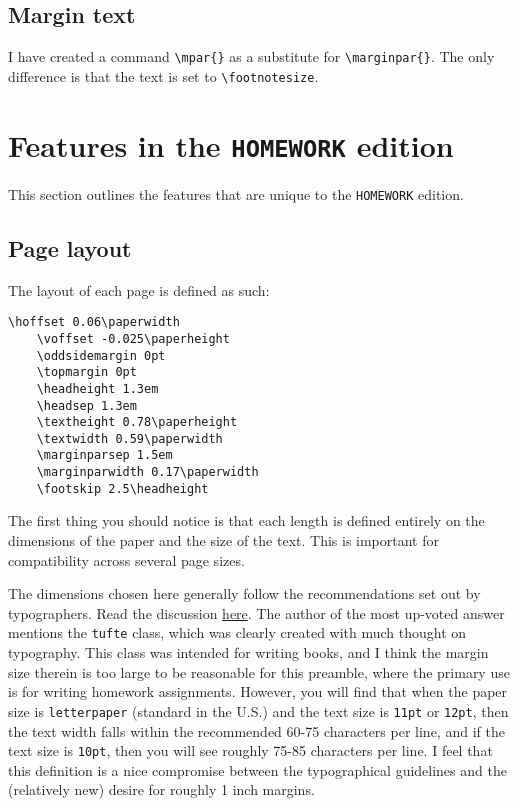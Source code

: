 \documentclass[letterpaper,12pt]{article}
\begin{document}
		\subsection{Margin text}
		I have created a command \verb|\mpar{}| as a substitute for 
		\verb|\marginpar{}|. The only difference is that the text is set to 
		\verb|\footnotesize|.


\section{Features in the \texttt{HOMEWORK} edition}
This section outlines the features that are unique to the \texttt{HOMEWORK} edition.

	\subsection{Page layout}
	The layout of each page is defined as such:
	\begin{Verbatim}[frame=single,gobble=1,fontsize=\small]
	\hoffset 0.06\paperwidth
	\voffset -0.025\paperheight
	\oddsidemargin 0pt
	\topmargin 0pt
	\headheight 1.3em
	\headsep 1.3em
	\textheight 0.78\paperheight
	\textwidth 0.59\paperwidth
	\marginparsep 1.5em
	\marginparwidth 0.17\paperwidth
	\footskip 2.5\headheight
	\end{Verbatim}
	The first thing you should notice is that each length is defined entirely on the dimensions of the paper and the size of the text. This is important for compatibility across several page sizes.
	
	The dimensions chosen here generally follow the recommendations set out by typographers. Read the discussion \href{http://tex.stackexchange.com/questions/71172/why-are-default-latex-margins-so-big}{here}. The author of the most up-voted answer mentions the \texttt{tufte} class, which was clearly created with much thought on typography. This class was intended for writing books, and I think the margin size therein is too large to be reasonable for this preamble, where the primary use is for writing homework assignments. However, you will find that when the paper size is \texttt{letterpaper} (standard in the U.S.) and the text size is \texttt{11pt} or \texttt{12pt}, then the text width falls within the recommended 60-75 characters per line, and if the text size is \texttt{10pt}, then you will see roughly 75-85 characters per line. I feel that this definition is a nice compromise between the typographical guidelines and the (relatively new) desire for roughly 1 inch margins.
	
\end{document}

